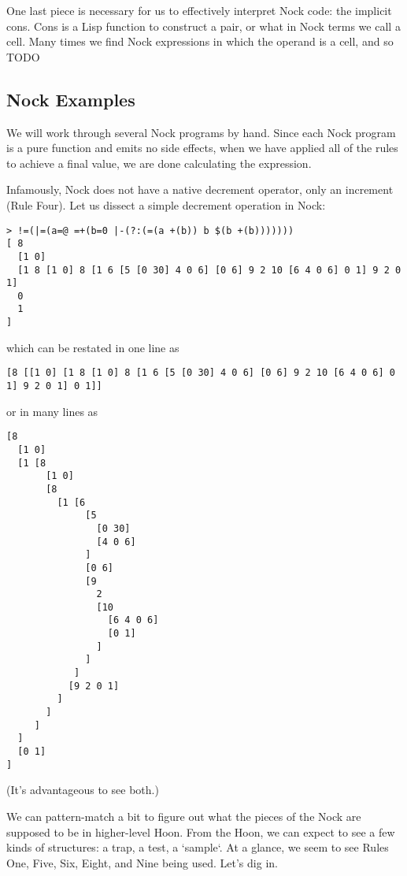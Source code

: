 One last piece is necessary for us to effectively interpret Nock code:  the implicit cons.  Cons is a Lisp function to construct a pair, or what in Nock terms we call a cell.  Many times we find Nock expressions in which the operand is a cell, and so TODO

\subsection{Nock Examples}

We will work through several Nock programs by hand.  Since each Nock program is a pure function and emits no side effects, when we have applied all of the rules to achieve a final value, we are done calculating the expression.

Infamously, Nock does not have a native decrement operator, only an increment (Rule Four).  Let us dissect a simple decrement operation in Nock:

\begin{lstlisting}[style=nonumbers]
> !=(|=(a=@ =+(b=0 |-(?:(=(a +(b)) b $(b +(b)))))))
[ 8
  [1 0]
  [1 8 [1 0] 8 [1 6 [5 [0 30] 4 0 6] [0 6] 9 2 10 [6 4 0 6] 0 1] 9 2 0 1]
  0
  1
]
\end{lstlisting}

which can be restated in one line as

\begin{lstlisting}[style=nonumbers]
[8 [[1 0] [1 8 [1 0] 8 [1 6 [5 [0 30] 4 0 6] [0 6] 9 2 10 [6 4 0 6] 0 1] 9 2 0 1] 0 1]]
\end{lstlisting}

or in many lines as

\begin{lstlisting}[style=numbers]
[8
  [1 0]
  [1 [8
       [1 0]
       [8
         [1 [6
              [5
                [0 30]
                [4 0 6]
              ]
              [0 6]
              [9
                2
                [10
                  [6 4 0 6]
                  [0 1]
                ]
              ]
            ]
           [9 2 0 1]
         ]
       ]
     ]
  ]
  [0 1]
]
\end{lstlisting}

(It's advantageous to see both.)

We can pattern-match a bit to figure out what the pieces of the Nock are supposed to be in higher-level Hoon.  From the Hoon, we can expect to see a few kinds of structures:  a trap, a test, a `sample`.  At a glance, we seem to see Rules One, Five, Six, Eight, and Nine being used.  Let's dig in.

